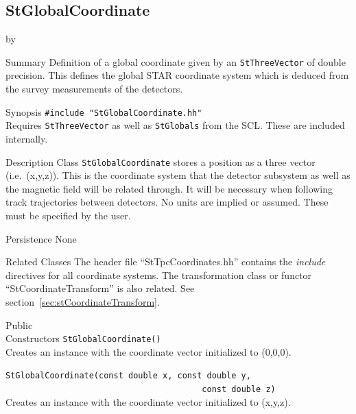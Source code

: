 \documentclass[twoside]{article}
\newcommand{\comp}[1]{\texttt{#1}}%
\newcommand{\entrylabel}[1]{\mbox{\textbf{{#1}}}\hfil}%
\newenvironment{entry}
{\begin{list}{}%
    {\renewcommand{\makelabel}{\entrylabel}%
     \setlength{\labelwidth}{90pt}%
     \setlength{\leftmargin}{\labelwidth}
     \advance\leftmargin by \labelsep%
      }%
    }%
  {\end{list}}
\newcommand{\Entrylabel}[1]%
{\raisebox{0pt}[1ex][0pt]{\makebox[\labelwidth][l]%
    {\parbox[t]{\labelwidth}{\hspace{0pt}\textbf{{#1}}}}}}
\newenvironment{Entry}%
{\renewcommand{\entrylabel}{\Entrylabel}\begin{entry}}%
  {\end{entry}}
\begin{document}
%
%
\subsection{StGlobalCoordinate} 
\label{sec:stGlobalCoordinate}

\begin{Entry}
\item[Summary]
  Definition of a global coordinate given by an \comp{StThreeVector}
  of double precision.  This defines the global STAR coordinate 
  system which is deduced from the survey measurements of the
  detectors.

\item[Synopsis]
  \verb+#include "StGlobalCoordinate.hh"+\\
  Requires \comp{StThreeVector}  as
  well as \comp{StGlobals} from the SCL.   These
  are included internally.

\item[Description]
Class \comp{StGlobalCoordinate} stores a position as a three
vector (i.e.~(x,y,z)).
This is the coordinate system that the detector subsystem as well as the
magnetic field will be related through.  It will be necessary when
following track trajectories between detectors.  No units are implied
or assumed.  These must be specified by the user.

\item[Persistence]
   None

\item[Related Classes]
The header file ``StTpcCoordinates.hh'' contains the {\em include}
directives for all coordinate systems.  The transformation class or
functor ``StCoordinateTransform'' is also related.  See 
section~\ref{sec:stCoordinateTransform}.

\item[Public \\ Constructors]
   \verb+StGlobalCoordinate()+\\
   Creates an instance with the coordinate vector initialized to (0,0,0).

   \verb+StGlobalCoordinate(const double x, const double y,+\\
   \verb+                                        const double z)+\\
   Creates an instance with the coordinate vector initialized to (x,y,z).


\end{Entry}
\end{document}
